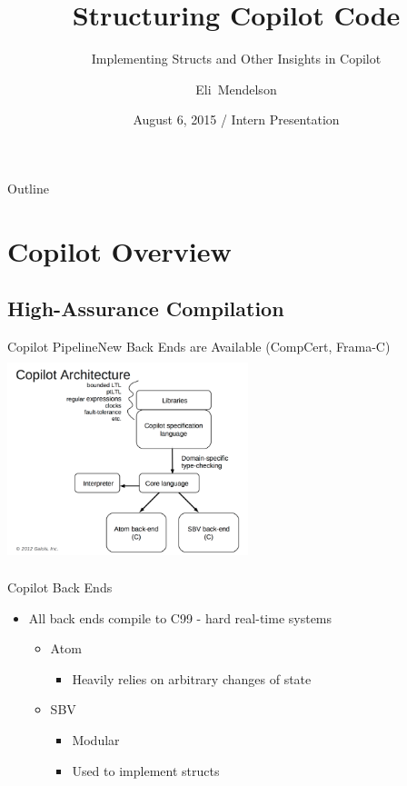 \documentclass[xcolor={dvipsnames}]{beamer}
\title[Implementing Structs \& Copilot Insights] %
{Structuring Copilot Code}
\subtitle
{Implementing Structs and Other Insights in Copilot} %
\author[Mendelson] %
{Eli~Mendelson}
\institute[NASA Langley Research Center] %
{
  Safety-Critical Avionics: Systems Branch\\
  NASA Langley Research Center}
\date[Intern Presentation] %
{August 6, 2015 / Intern Presentation}
\begin{document}
\begin{frame}
  \titlepage
\end{frame}

\begin{frame}{Outline}
  \tableofcontents[pausesections]
\end{frame}




\section{Copilot Overview}

\subsection[Haskell eDSL]{High-Assurance Compilation}

\begin{frame}{Copilot Pipeline}{New Back Ends are Available (CompCert, Frama-C)}
\centering\includegraphics[width=7.0cm, height=6.0cm]{Copilot_architecture}
\end{frame}

\begin{frame}{Copilot Back Ends}
  \begin{itemize}
  \item
    All back ends compile to C99 - \alert{hard real-time} systems
    \begin{itemize}
    \item
      Atom
      \begin{itemize}
        \item
        Heavily relies on arbitrary changes of state
      \end{itemize}
    \item
      SBV
      \begin{itemize}
        \item
        Modular
        \item
        Used to \alert{implement structs}
      \end{itemize}
    \end{itemize}
  \end{itemize}
\end{frame}
\end{document}
